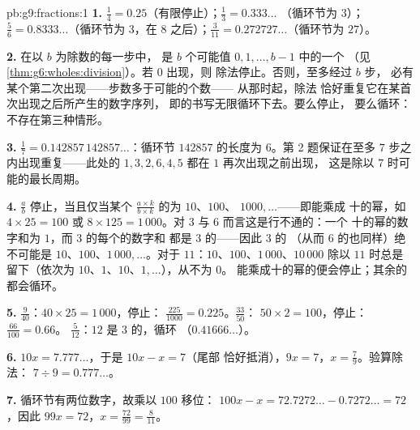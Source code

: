 \begin{solution}{pb:g9:fractions:1}
\textbf{1.} $\frac14 = 0.25$（有限停止）；$\frac13 = 0.333\ldots$
（循环节为 $3$）；$\frac56 = 0.8333\ldots$（循环节为 $3$，在
$8$ 之后）；$\frac{3}{11} = 0.272727\ldots$（循环节为 $27$）。

\textbf{2.} 在以 $b$ 为除数的每一步中，
是 $b$ 个可能值 $0, 1, \dots, b - 1$ 中的一个
（见\cref{thm:g6:wholes:division}）。若 $0$ 出现，则
除法停止。否则，至多经过 $b$ 步，
必有某个第二次出现——步数多于可能的个数——
从那时起，除法
恰好重复它在某首次出现之后所产生的数字序列，
即的书写无限循环下去。要么停止，
要么循环：不存在第三种情形。

\textbf{3.} $\frac17 = 0.142857\,142857\ldots$：循环节
$142857$ 的长度为 $6$。第 2 题保证在至多
$7$ 步之内出现重复——此处的
$1, 3, 2, 6, 4, 5$ 都在 $1$ 再次出现之前出现，
这是除以 $7$ 时可能的最长周期。

\textbf{4.} $\frac ab$ 停止，当且仅当某个
$\frac{a \times k}{b \times k}$ 的为 $10$、$100$、
$1000, \dots$——即能乘成
十的幂，如 $4 \times 25 = 100$ 或
$8 \times 125 = 1\,000$。对 $3$ 与 $6$ 而言这是行不通的：一个
十的幂的数字和为 $1$，而 $3$ 的每个的数字和
都是 $3$ 的——因此 $3$ 的
（从而 $6$ 的也同样）绝不可能是 $10$、$100$、$1\,000, \dots$。对于
$11$：$10$、$100$、$1\,000$、$10\,000$ 除以 $11$ 时总是
留下（依次为 $10$、$1$、$10$、$1, \dots$），从不为 $0$。
能乘成十的幂的便会停止；其余的都会循环。

\textbf{5.} $\frac{9}{40}$：$40 \times 25 = 1\,000$，停止：
$\frac{225}{1000} = 0.225$。$\frac{33}{50}$：
$50 \times 2 = 100$，停止：$\frac{66}{100} = 0.66$。
$\frac{5}{12}$：$12$ 是 $3$ 的，循环
（$0.41666\ldots$）。

\textbf{6.} $10x = 7.777\ldots$，于是 $10x - x = 7$（尾部
恰好抵消），$9x = 7$，$x = \frac79$。验算除法：
$7 \div 9 = 0.777\ldots$。

\textbf{7.} 循环节有两位数字，故乘以 $100$ 移位：
$100x - x = 72.7272\ldots - 0.7272\ldots = 72$，因此
$99x = 72$，$x = \frac{72}{99} = \frac{8}{11}$。


\end{solution}

